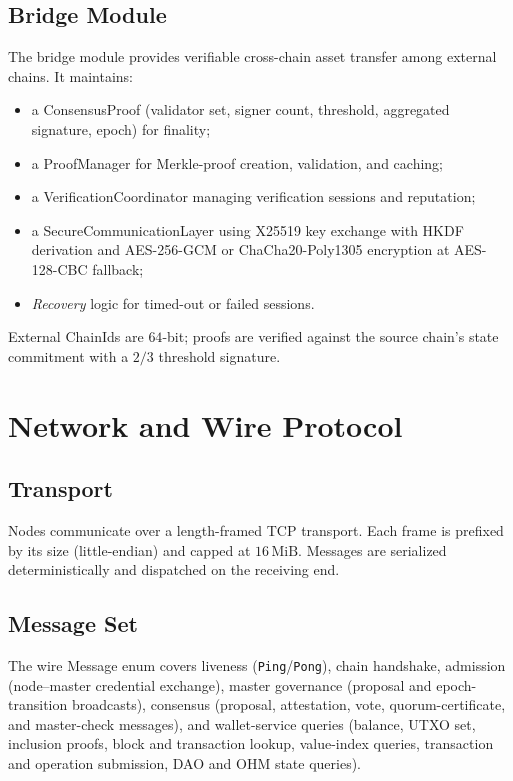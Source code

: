 \documentclass[11pt,a4paper]{article}
\theoremstyle{definition}
\newcommand{\ChainId}{\textsf{ChainId}}
\newcommand{\ConsensusProof}{\textsf{ConsensusProof}}
\newcommand{\Message}{\textsf{Message}}
\newcommand{\ProofManager}{\textsf{ProofManager}}
\newcommand{\SecureCommunicationLayer}{\textsf{SecureCommunicationLayer}}
\newcommand{\VerificationCoordinator}{\textsf{VerificationCoordinator}}
\begin{document}
\subsection{Bridge Module}

The bridge module provides verifiable cross-chain asset transfer among external
chains.  It maintains:
\begin{itemize}[leftmargin=2em]
  \item a \ConsensusProof{} (validator set, signer count, threshold, aggregated
    signature, epoch) for finality;
  \item a \ProofManager{} for Merkle-proof creation, validation, and caching;
  \item a \VerificationCoordinator{} managing verification sessions and
    reputation;
  \item a \SecureCommunicationLayer{} using X25519 key exchange with HKDF
    derivation and AES-256-GCM or ChaCha20-Poly1305 encryption at AES-128-CBC fallback;
  \item \emph{Recovery} logic for timed-out or failed sessions.
\end{itemize}
External \ChainId{}s are $64$-bit; proofs are verified against the source
chain's state commitment with a $2/3$ threshold signature.

\section{Network and Wire Protocol}
\label{sec:net}

\subsection{Transport}

Nodes communicate over a length-framed TCP transport.  Each frame is prefixed
by its size (little-endian) and capped at $16\,\mathrm{MiB}$.  Messages are
serialized deterministically and dispatched on the receiving end.

\subsection{Message Set}

The wire \Message{} enum covers liveness (\texttt{Ping}/\texttt{Pong}), chain
handshake, admission (node--master credential exchange), master governance
(proposal and epoch-transition broadcasts), consensus (proposal, attestation,
vote, quorum-certificate, and master-check messages), and wallet-service
queries (balance, UTXO set, inclusion proofs, block and transaction lookup,
value-index queries, transaction and operation submission, DAO and OHM state
queries).
\end{document}
